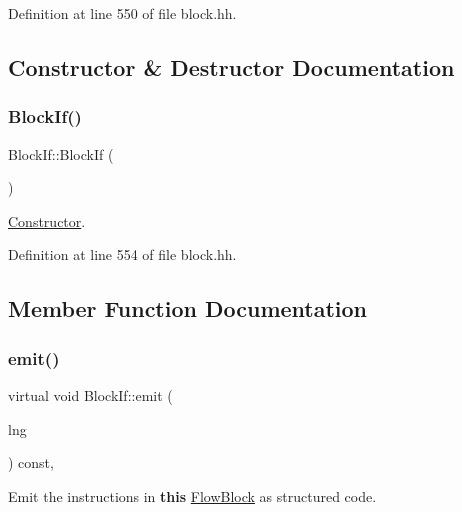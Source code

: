 Definition at line 550 of file block.\+hh.



\subsection{Constructor \& Destructor Documentation}
\mbox{\label{class_block_if_a6699014493d18a7da68acba2ecb37f3d}} 
\subsubsection{\texorpdfstring{BlockIf()}{BlockIf()}}
{\footnotesize\ttfamily Block\+If\+::\+Block\+If (\begin{DoxyParamCaption}\item[{void}]{ }\end{DoxyParamCaption})\hspace{0.3cm}{\ttfamily [inline]}}



\mbox{\hyperlink{class_constructor}{Constructor}}. 



Definition at line 554 of file block.\+hh.



\subsection{Member Function Documentation}
\mbox{\label{class_block_if_a81d526be9d8cca137f9008ac7a12d410}} 
\subsubsection{\texorpdfstring{emit()}{emit()}}
{\footnotesize\ttfamily virtual void Block\+If\+::emit (\begin{DoxyParamCaption}\item[{\mbox{\hyperlink{class_print_language}{Print\+Language}} $\ast$}]{lng }\end{DoxyParamCaption}) const\hspace{0.3cm}{\ttfamily [inline]}, {\ttfamily [virtual]}}



Emit the instructions in {\bfseries{this}} \mbox{\hyperlink{class_flow_block}{Flow\+Block}} as structured code. 

